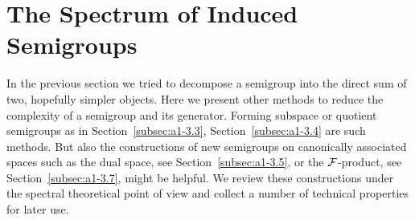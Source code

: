 
\section{The Spectrum of Induced Semigroups}\label{sec:a3-4}
In the previous section we tried to decompose a semigroup into the direct sum of two, hopefully simpler objects.
Here we present other methods to reduce the complexity of a semigroup and its generator.
Forming subspace or quotient semigroups as in Section~\ref{subsec:a1-3.3}, Section~\ref{subsec:a1-3.4} are such methods.
But also the constructions of new semigroups on canonically associated spaces such as the dual space, see Section~\ref{subsec:a1-3.5}, or the $\mathcal{F}$-product, see Section~\ref{subsec:a1-3.7}, might be helpful.
We review these constructions under the spectral theoretical point of view and collect a number of technical properties for later use.

